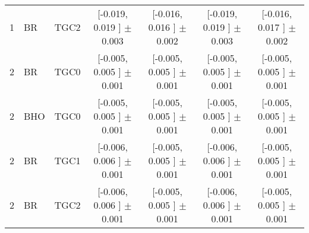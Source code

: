 \begin{landscape}
\begin{table}[htbp]
\begin{tabular}{lllcccc}
 1 & BR  & TGC2 &  [-0.019, 0.019 ] $\pm$ 0.003 &  [-0.016, 0.016 ] $\pm$ 0.002 &  [-0.019, 0.019 ] $\pm$ 0.003 &  [-0.016, 0.017 ] $\pm$ 0.002 \\
 2 & BR  & TGC0 &  [-0.005, 0.005 ] $\pm$ 0.001 &  [-0.005, 0.005 ] $\pm$ 0.001 &  [-0.005, 0.005 ] $\pm$ 0.001 &  [-0.005, 0.005 ] $\pm$ 0.001 \\
 2 & BHO & TGC0 &  [-0.005, 0.005 ] $\pm$ 0.001 &  [-0.005, 0.005 ] $\pm$ 0.001 &  [-0.005, 0.005 ] $\pm$ 0.001 &  [-0.005, 0.005 ] $\pm$ 0.001 \\
 2 & BR  & TGC1 &  [-0.006, 0.006 ] $\pm$ 0.001 &  [-0.005, 0.005 ] $\pm$ 0.001 &  [-0.006, 0.006 ] $\pm$ 0.001 &  [-0.005, 0.005 ] $\pm$ 0.001 \\
 2 & BR  & TGC2 &  [-0.006, 0.006 ] $\pm$ 0.001 &  [-0.005, 0.005 ] $\pm$ 0.001 &  [-0.006, 0.006 ] $\pm$ 0.001 &  [-0.005, 0.005 ] $\pm$ 0.001 \\
\hline\hline
\end{tabular}
\end{table}
 \end{landscape}

